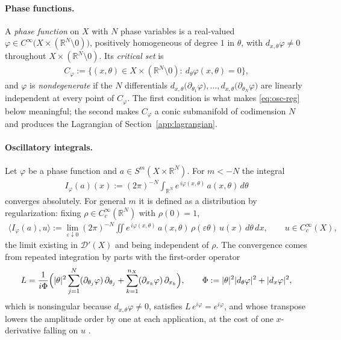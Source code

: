\documentclass[12pt]{article}
\numberwithin{equation}{section}
\numberwithin{figure}{section}
\numberwithin{equation}{section}
\begin{document}
\paragraph{Phase functions.}
A \emph{phase function} on $X$ with $N$ phase variables is a real-valued
$\varphi\in C^\infty\bigl(X\times(\mathbb{R}^N\setminus0)\bigr)$, positively
homogeneous of degree $1$ in $\theta$, with $d_{x,\theta}\varphi\neq0$ throughout
$X\times(\mathbb{R}^N\setminus0)$.  Its \emph{critical set} is
\begin{align}
    C_\varphi:=\bigl\{(x,\theta)\in X\times(\mathbb{R}^N\setminus0):\
    d_\theta\varphi(x,\theta)=0\bigr\},
    \label{eq:critical-set}
\end{align}
and $\varphi$ is \emph{nondegenerate} if the $N$ differentials
$d_{x,\theta}\bigl(\partial_{\theta_1}\varphi\bigr),\dots,
d_{x,\theta}\bigl(\partial_{\theta_N}\varphi\bigr)$ are linearly independent at
every point of $C_\varphi$.  The first condition is what makes \eqref{eq:osc-reg}
below meaningful; the second makes $C_\varphi$ a conic submanifold of codimension
$N$ and produces the Lagrangian of Section~\ref{app:lagrangian}.

\paragraph{Oscillatory integrals.}
Let $\varphi$ be a phase function and $a\in S^m(X\times\mathbb{R}^N)$.  For
$m<-N$ the integral
\begin{align}
    I_\varphi(a)(x)
    :=(2\pi)^{-N}\int_{\mathbb{R}^N}e^{\,i\varphi(x,\theta)}\,a(x,\theta)\,d\theta
    \label{eq:osc-int}
\end{align}
converges absolutely.  For general $m$ it is defined as a distribution by
regularization: fixing $\rho\in C_c^\infty(\mathbb{R}^N)$ with $\rho(0)=1$,
\begin{align}
    \bigl\langle I_\varphi(a),u\bigr\rangle
    :=\lim_{\varepsilon\downarrow0}(2\pi)^{-N}\iint
    e^{\,i\varphi(x,\theta)}\,a(x,\theta)\,\rho(\varepsilon\theta)\,u(x)
    \,d\theta\,dx,
    \qquad u\in C_c^\infty(X),
    \label{eq:osc-reg}
\end{align}
the limit existing in $\mathcal D'(X)$ and being independent of $\rho$.  The
convergence comes from repeated integration by parts with the first-order operator
\begin{align*}
    L=\frac{1}{i\Phi}\Bigl(
    |\theta|^{2}\sum_{j=1}^{N}(\partial_{\theta_j}\varphi)\,\partial_{\theta_j}
    +\sum_{k=1}^{n_X}(\partial_{x_k}\varphi)\,\partial_{x_k}\Bigr),
    \qquad
    \Phi:=|\theta|^{2}|d_\theta\varphi|^{2}+|d_x\varphi|^{2},
\end{align*}
which is nonsingular because $d_{x,\theta}\varphi\neq0$, satisfies
$L\,e^{i\varphi}=e^{i\varphi}$, and whose transpose lowers the amplitude order by
one at each application, at the cost of one $x$-derivative falling on $u$
\cite[Ch.~1]{grigis_MicrolocalAnalysisDifferential_1994}.
\end{document}
